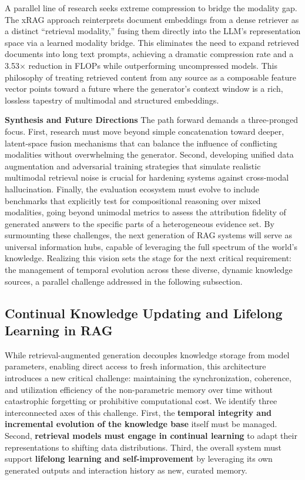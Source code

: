 \documentclass[11pt,a4paper]{article}
\begin{document}
A parallel line of research seeks extreme compression to bridge the modality gap. The xRAG approach \cite{arxiv:2405.13792v1} reinterprets document embeddings from a dense retriever as a distinct ``retrieval modality,'' fusing them directly into the LLM's representation space via a learned modality bridge. This eliminates the need to expand retrieved documents into long text prompts, achieving a dramatic compression rate and a 3.53$\times$ reduction in FLOPs while outperforming uncompressed models. This philosophy of treating retrieved content from any source as a composable feature vector points toward a future where the generator's context window is a rich, lossless tapestry of multimodal and structured embeddings.

\textbf{Synthesis and Future Directions}  
The path forward demands a three-pronged focus. First, research must move beyond simple concatenation toward deeper, latent-space fusion mechanisms that can balance the influence of conflicting modalities without overwhelming the generator. Second, developing unified data augmentation and adversarial training strategies that simulate realistic multimodal retrieval noise is crucial for hardening systems against cross-modal hallucination. Finally, the evaluation ecosystem must evolve to include benchmarks that explicitly test for compositional reasoning over mixed modalities, going beyond unimodal metrics to assess the attribution fidelity of generated answers to the specific parts of a heterogeneous evidence set. By surmounting these challenges, the next generation of RAG systems will serve as universal information hubs, capable of leveraging the full spectrum of the world's knowledge. Realizing this vision sets the stage for the next critical requirement: the management of temporal evolution across these diverse, dynamic knowledge sources, a parallel challenge addressed in the following subsection.


\subsection{Continual Knowledge Updating and Lifelong Learning in RAG}


While retrieval-augmented generation decouples knowledge storage from model parameters, enabling direct access to fresh information, this architecture introduces a new critical challenge: maintaining the synchronization, coherence, and utilization efficiency of the non-parametric memory over time without catastrophic forgetting or prohibitive computational cost. We identify three interconnected axes of this challenge. First, the \textbf{temporal integrity and incremental evolution of the knowledge base} itself must be managed. Second, \textbf{retrieval models must engage in continual learning} to adapt their representations to shifting data distributions. Third, the overall system must support \textbf{lifelong learning and self-improvement} by leveraging its own generated outputs and interaction history as new, curated memory.
\end{document}
